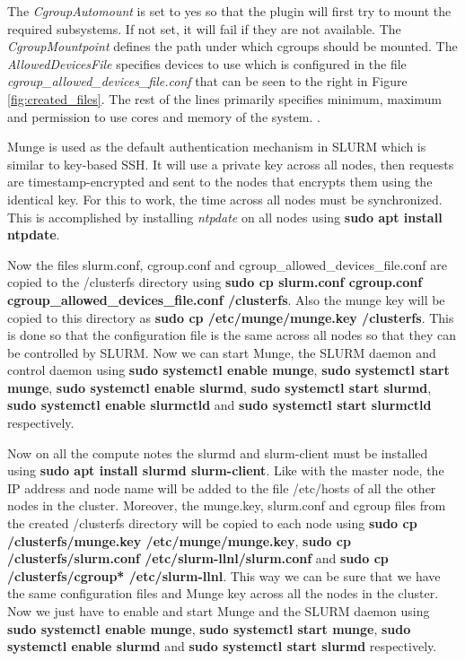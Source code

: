 \documentclass[../Head/Report.tex]{subfiles}
\begin{document}
The \textit{CgroupAutomount} is set to yes so that the plugin will first try to mount the required subsystems. If not set, it will fail if they are not available. The \textit{CgroupMountpoint} defines the path under which cgroups should be mounted. The \textit{AllowedDevicesFile} specifies devices to use which is configured in the file \textit{cgroup\_allowed\_devices\_file.conf} that can be seen to the right in Figure \ref{fig:created_files}. The rest of the lines primarily specifies minimum, maximum and permission to use cores and memory of the system. \cite{cgroups} \cite{piCluster}. 

Munge is used as the default authentication mechanism in SLURM which is similar to key-based SSH. It will use a private key across all nodes, then requests are timestamp-encrypted and sent to the nodes that encrypts them using the identical key. For this to work, the time across all nodes must be synchronized. This is accomplished by installing \textit{ntpdate} on all nodes using \textbf{sudo apt install ntpdate}. 

Now the files slurm.conf, cgroup.conf and cgroup\_allowed\_devices\_file.conf are copied to the /clusterfs directory using \textbf{sudo cp slurm.conf cgroup.conf cgroup\_allowed\_devices\_file.conf /clusterfs}. Also the munge key will be copied to this directory as \textbf{sudo cp /etc/munge/munge.key /clusterfs}. This is done so that the configuration file is the same across all nodes so that they can be controlled by SLURM. Now we can start Munge, the SLURM daemon and control daemon using \textbf{sudo systemctl enable munge}, \textbf{sudo systemctl start munge}, \textbf{sudo systemctl enable slurmd}, \textbf{sudo systemctl start slurmd}, \textbf{sudo systemctl enable slurmctld} and \textbf{sudo systemctl start slurmctld} respectively.

Now on all the compute notes the slurmd and slurm-client must be installed using \textbf{sudo apt install slurmd slurm-client}. Like with the master node, the IP address and node name will be added to the file /etc/hosts of all the other nodes in the cluster. Moreover, the munge.key, slurm.conf and cgroup files from the created /clusterfs directory will be copied to each node using \textbf{sudo cp /clusterfs/munge.key /etc/munge/munge.key}, \textbf{sudo cp /clusterfs/slurm.conf /etc/slurm-llnl/slurm.conf} and \textbf{sudo cp /clusterfs/cgroup* /etc/slurm-llnl}. This way we can be sure that we have the same configuration files and Munge key across all the nodes in the cluster. Now we just have to enable and start Munge and the SLURM daemon using \textbf{sudo systemctl enable munge}, \textbf{sudo systemctl start munge}, \textbf{sudo systemctl enable slurmd} and \textbf{sudo systemctl start slurmd} respectively.
\end{document}
